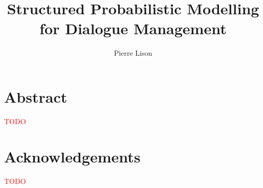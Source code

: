 \documentclass[english,12pt]{uiophd}
\title{Structured Probabilistic Modelling \\ for Dialogue Management}
\author{Pierre Lison}
\newcommand{\note}[1]{\textcolor{red}{#1}}
\begin{document}
\frontmatter
\maketitle

\chapterfont{\centering}

\chapter*{Abstract}

\note{TODO}

\chapter*{Acknowledgements}

\note{TODO}

\chapterfont{\raggedright}

\tableofcontents

\mainmatter















\appendix



\backmatter




\newpage
{}

\printindex
\end{document}
